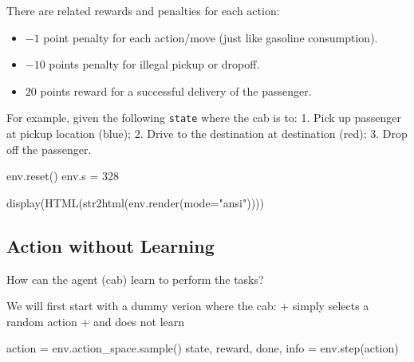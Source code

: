\documentclass[
  letterpaper,
]{scrbook}
\newenvironment{Shaded}{\begin{snugshade}}{\end{snugshade}}
\newcommand{\DecValTok}[1]{\textcolor[rgb]{0.68,0.00,0.00}{#1}}
\newcommand{\NormalTok}[1]{\textcolor[rgb]{0.00,0.23,0.31}{#1}}
\newcommand{\OperatorTok}[1]{\textcolor[rgb]{0.37,0.37,0.37}{#1}}
\newcommand{\StringTok}[1]{\textcolor[rgb]{0.13,0.47,0.30}{#1}}
\providecommand{\tightlist}{%
  \setlength{\itemsep}{0pt}\setlength{\parskip}{0pt}}
\begin{document}
There are related rewards and penalties for each action:

\begin{itemize}
\tightlist
\item
  \(-1\) point penalty for each action/move (just like gasoline
  consumption).
\item
  \(-10\) points penalty for illegal pickup or dropoff.
\item
  \(20\) points reward for a successful delivery of the passenger.
\end{itemize}

For example, given the following \texttt{state} where the cab is to: 1.
Pick up passenger at pickup location (blue); 2. Drive to the destination
at destination (red); 3. Drop off the passenger.

\begin{Shaded}
\begin{Highlighting}[]
\NormalTok{env.reset()}
\NormalTok{env.s }\OperatorTok{=} \DecValTok{328}
\end{Highlighting}
\end{Shaded}

\begin{Shaded}
\begin{Highlighting}[]
\NormalTok{display(HTML(str2html(env.render(mode}\OperatorTok{=}\StringTok{"ansi"}\NormalTok{))))}
\end{Highlighting}
\end{Shaded}

\subsection*{Action without Learning}\label{action-without-learning}

How can the agent (cab) learn to perform the tasks?

We will first start with a dummy verion where the cab: + simply selects
a random action + and does not learn

\begin{Shaded}
\begin{Highlighting}[]
\NormalTok{    action }\OperatorTok{=}\NormalTok{ env.action\_space.sample()}
\NormalTok{    state, reward, done, info }\OperatorTok{=}\NormalTok{ env.step(action)}
\end{Highlighting}
\end{Shaded}
\end{document}
